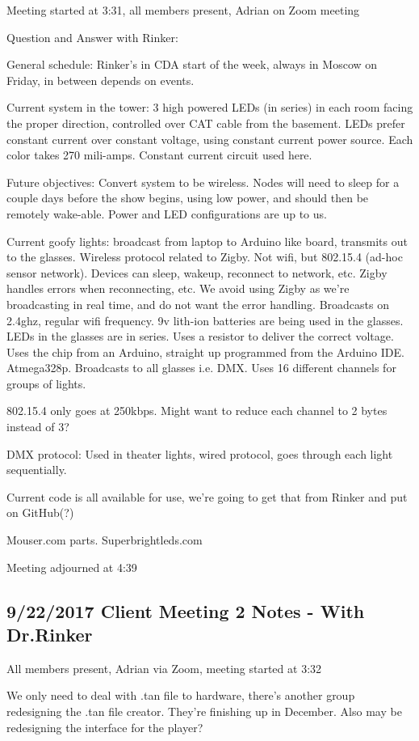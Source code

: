 \documentclass[12pt]{article}
\begin{document}
	Meeting started at 3:31, all members present, Adrian on Zoom meeting

Question and Answer with Rinker:

General schedule: Rinker's in CDA start of the week, always in Moscow on Friday, in between depends on events.

Current system in the tower: 3 high powered LEDs (in series) in each room facing the proper direction, controlled over CAT cable from the basement. LEDs prefer constant current over constant voltage, using constant current power source. Each color takes 270 mili-amps. Constant current circuit used here.

Future objectives: Convert system to be wireless. Nodes will need to sleep for a couple days before the show begins, using low power, and should then be remotely wake-able. Power and LED configurations are up to us.

Current goofy lights: broadcast from laptop to Arduino like board, transmits out to the glasses. Wireless protocol related to Zigby. Not wifi, but 802.15.4 (ad-hoc sensor network). Devices can sleep, wakeup, reconnect to network, etc. Zigby handles errors when reconnecting, etc. We avoid using Zigby as we’re broadcasting in real time, and do not want the error handling. Broadcasts on 2.4ghz, regular wifi frequency. 9v lith-ion batteries are being used in the glasses. LEDs in the glasses are in series. Uses a resistor to deliver the correct voltage. Uses the chip from an Arduino, straight up programmed from the Arduino IDE. Atmega328p. Broadcasts to all glasses i.e. DMX. Uses 16 different channels for groups of lights.

802.15.4 only goes at 250kbps. Might want to reduce each channel to 2 bytes instead of 3?

DMX protocol: Used in theater lights, wired protocol, goes through each light sequentially.

Current code is all available for use, we're going to get that from Rinker and put on GitHub(?)

Mouser.com parts. Superbrightleds.com	

Meeting adjourned at 4:39

	\clearpage
	\subsection{9/22/2017 Client Meeting 2 Notes - With Dr.Rinker}
	All members present, Adrian via Zoom, meeting started at 3:32

We only need to deal with .tan file to hardware, there’s another group redesigning the .tan file creator. They’re finishing up in December. Also may be redesigning the interface for the player?
\end{document}
